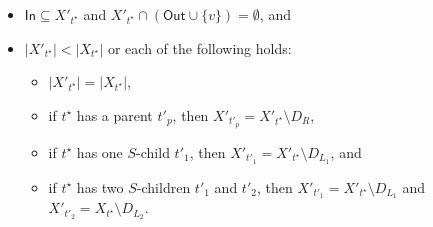 \documentclass[a4paper,UKenglish,cleveref, autoref, thm-restate, numberwithinsect]{lipics-v2021}
\newcommand{\In}{\mathsf{In}}
\newcommand{\Out}{\mathsf{Out}}
\begin{document}
\begin{lemma}
\begin{itemize}
\item $\In\subseteq X'_{t^{\star}}$ and $X'_{t^{\star}}\cap (\Out\cup\{v\})=\emptyset$, and
\item $|X'_{t^{\star}}|<|X_{t^{\star}}|$ or each of the following holds:
\begin{itemize}
    \item $|X'_{t^{\star}}|=|X_{t^{\star}}|$,
    \item if $t^{\star}$ has a parent $t'_p$, then $X'_{t'_p}=X'_{t^{\star}}\setminus D_R$, 
    \item if $t^{\star}$ has one $S$-child $t'_1$, then $X'_{t'_1}=X'_{t^{\star}}\setminus D_{L_1}$, and 
    \item if $t^{\star}$ has two $S$-children $t'_1$ and $t'_2$, then $X'_{t'_1}=X'_{t^{\star}}\setminus D_{L_1}$ and $X'_{t'_2}=X_{t^{\star}}\setminus D_{L_2}$.
\end{itemize}
\end{itemize}
\end{lemma}
\end{document}
